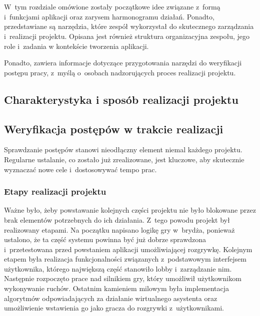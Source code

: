 \chapter{\ChapterTitleWorkOrganization}
\label{sec:organizacja-pracy}

W~tym rozdziale omówione zostały początkowe idee związane z~formą i~funkcjami
aplikacji oraz zarysem harmonogramu działań. Ponadto, przedstawiane
są narzędzia, które zespół wykorzystał do skutecznego zarządzania
i~realizacji projektu. Opisana jest również struktura organizacyjna
zespołu, jego role i~zadania w kontekście tworzenia aplikacji.

Ponadto, zawiera informacje dotyczące przygotowania narzędzi do
weryfikacji postępu pracy, z~myślą o~osobach nadzorujących proces
realizacji projektu.

\section{Charakterystyka i sposób realizacji projektu}


\section{Weryfikacja postępów w trakcie realizacji}

Sprawdzanie postępów stanowi nieodłączny element niemal każdego
projektu. Regularne ustalanie, co zostało już zrealizowane, jest kluczowe,
aby skutecznie wyznaczać nowe cele i~dostosowywać tempo prac.

\subsection{Etapy realizacji projektu}

Ważne było, żeby powstawanie kolejnych części projektu nie było blokowane przez
brak elementów potrzebnych do ich działania. Z~tego powodu projekt był realizowany
etapami. Na początku napisano logikę gry w~brydża, ponieważ ustalono, że ta część
systemu powinna być już dobrze sprawdzona i~przetestowana przed powstaniem
aplikacji umożliwiającej rozgrywkę. Kolejnym etapem była realizacja funkcjonalności
związanych z~podstawowym interfejsem użytkownika, którego największą część
stanowiło lobby i~zarządzanie nim. Następnie rozpoczęto prace nad silnikiem gry, który
umożliwił użytkownikom wykonywanie ruchów. Ostatnim kamieniem milowym była implementacja
algorytmów odpowiadających za działanie wirtualnego asystenta oraz umożliwienie
wstawienia go jako gracza do rozgrywki z~użytkownikami.

